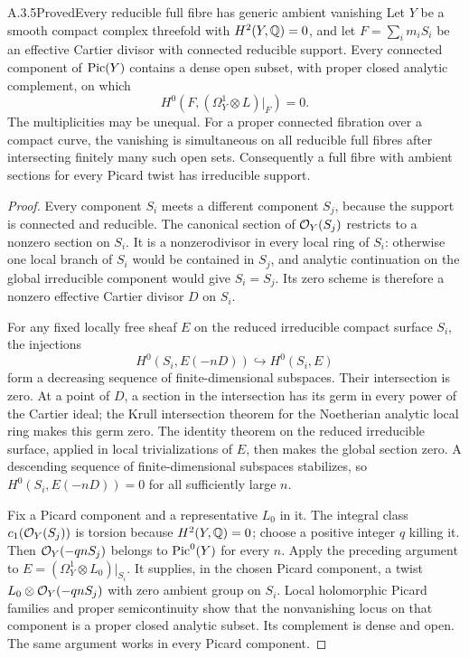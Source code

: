\begin{statement}{A.3.5}{Proved}{Every reducible full fibre has generic ambient vanishing}
Let $Y$ be a smooth compact complex threefold with $H^2(Y,\mathbb Q)=0$, and let $F=\sum_i m_iS_i$ be an effective Cartier divisor with connected reducible support. Every connected component of $\operatorname{Pic}(Y)$ contains a dense open subset, with proper closed analytic complement, on which
\[
 H^0(F,(\Omega_Y^1\otimes L)|_F)=0.
 \tag{A.15b}
\]
The multiplicities may be unequal. For a proper connected fibration over a compact curve, the vanishing is simultaneous on all reducible full fibres after intersecting finitely many such open sets. Consequently a full fibre with ambient sections for every Picard twist has irreducible support.
\end{statement}
\begin{proof}
Every component $S_i$ meets a different component $S_j$, because the support is connected and reducible. The canonical section of $\mathcal O_Y(S_j)$ restricts to a nonzero section on $S_i$. It is a nonzerodivisor in every local ring of $S_i$: otherwise one local branch of $S_i$ would be contained in $S_j$, and analytic continuation on the global irreducible component would give $S_i=S_j$. Its zero scheme is therefore a nonzero effective Cartier divisor $D$ on $S_i$.

For any fixed locally free sheaf $E$ on the reduced irreducible compact surface $S_i$, the injections
\[
 H^0(S_i,E(-nD))\hookrightarrow H^0(S_i,E)
\]
form a decreasing sequence of finite-dimensional subspaces. Their intersection is zero. At a point of $D$, a section in the intersection has its germ in every power of the Cartier ideal; the Krull intersection theorem for the Noetherian analytic local ring makes this germ zero. The identity theorem on the reduced irreducible surface, applied in local trivializations of $E$, then makes the global section zero. A descending sequence of finite-dimensional subspaces stabilizes, so $H^0(S_i,E(-nD))=0$ for all sufficiently large $n$.

Fix a Picard component and a representative $L_0$ in it. The integral class $c_1(\mathcal O_Y(S_j))$ is torsion because $H^2(Y,\mathbb Q)=0$; choose a positive integer $q$ killing it. Then $\mathcal O_Y(-qnS_j)$ belongs to $\operatorname{Pic}^0(Y)$ for every $n$. Apply the preceding argument to $E=(\Omega_Y^1\otimes L_0)|_{S_i}$. It supplies, in the chosen Picard component, a twist $L_0\otimes\mathcal O_Y(-qnS_j)$ with zero ambient group on $S_i$. Local holomorphic Picard families and proper semicontinuity show that the nonvanishing locus on that component is a proper closed analytic subset. Its complement is dense and open. The same argument works in every Picard component.


\end{proof}
